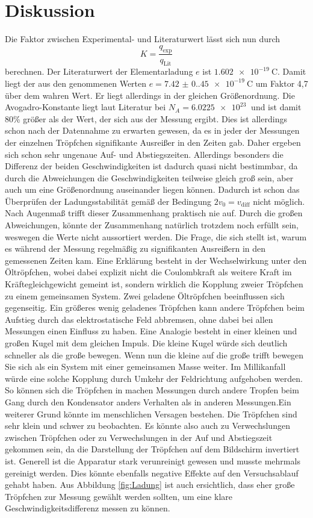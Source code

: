 \section{Diskussion}
Die Faktor zwischen Experimental- und Literaturwert lässt sich nun durch 
\begin{equation}
    K =\frac{q_\text{exp}}{q_\text{Lit}}
\end{equation}
berechnen.
Der Literaturwert der Elementarladung $e$ ist $\qty{1.602e-19}{\coulomb}$\cite{PhysikTabellen}. Damit liegt der aus den genommenen Werten 
$e=\qty{7.42(0.45)e-19}{\coulomb}$ um Faktor 4,7 über dem wahren Wert. Er liegt allerdings in der gleichen Größenordnung.
Die Avogadro-Konstante liegt laut Literatur bei $N_A=\qty{6.0225e23}{}$\cite{PhysikTabellen} und ist damit 80\% größer als der Wert, der sich aus der Messung
ergibt. Dies ist allerdings schon nach der Datennahme zu erwarten gewesen, da es in jeder der Messungen der einzelnen Tröpfchen signifikante
Ausreißer in den Zeiten gab. Daher ergeben sich schon sehr ungenaue Auf- und Abstiegszeiten. Allerdings besonders die Differenz der beiden
Geschwindigkeiten ist dadurch quasi nicht bestimmbar, da durch die Abweichungen die Geschwindigkeiten teilweise gleich groß sein, aber auch um eine Größenordnung auseinander liegen können.
Dadurch ist schon das Überprüfen der Ladungsstabilität gemäß der Bedingung $2v_0=v_\text{diff}$ nicht möglich.
Nach Augenmaß trifft dieser Zusammenhang praktisch nie auf. Durch die großen Abweichungen, könnte der Zusammenhang natürlich trotzdem 
noch erfüllt sein, weswegen die Werte nicht aussortiert werden. Die Frage, die sich stellt ist, warum es während der Messung regelmäßig zu signifikanten
Ausreißern in den gemessenen Zeiten kam. Eine Erklärung besteht in der Wechselwirkung unter den Öltröpfchen, wobei dabei explizit nicht die Coulombkraft als weitere Kraft im
Kräftegleichgewicht gemeint ist, sondern wirklich die Kopplung zweier Tröpfchen zu einem gemeinsamen System. Zwei geladene Öltröpfchen
beeinflussen sich gegenseitig. Ein größeres wenig geladenes Tröpfchen kann andere Tröpfchen beim Aufstieg durch das elektrostatische Feld abbremsen,
ohne dabei bei allen Messungen einen Einfluss zu haben. Eine Analogie besteht in einer kleinen und großen Kugel mit dem gleichen Impuls. Die kleine Kugel würde sich deutlich schneller als die große bewegen.
Wenn nun die kleine auf die große trifft bewegen Sie sich als ein System mit einer gemeinsamen Masse weiter. Im Millikanfall würde eine solche Kopplung durch Umkehr der Feldrichtung aufgehoben werden. So 
können sich die Tröpfchen in machen Messungen durch andere Tropfen beim Gang durch den Kondensator anders Verhalten als in anderen Messungen.Ein weiterer Grund könnte im menschlichen Versagen bestehen. Die Tröpfchen sind sehr klein und schwer zu beobachten.
Es könnte also auch zu Verwechslungen zwischen Tröpfchen oder zu Verwechslungen in der Auf und Abstiegszeit gekommen sein, da die Darstellung der
Tröpfchen auf dem Bildschirm invertiert ist. Generell ist die Apparatur stark verunreinigt gewesen und musste mehrmals gereinigt werden. Dies könnte ebenfalls
negative Effekte auf den Versuchsablauf gehabt haben. Aus Abbildung \ref{fig:Ladung} ist auch ersichtlich, dass eher große Tröpfchen
zur Messung gewählt werden sollten, um eine klare Geschwindigkeitsdifferenz messen zu können.
\label{sec:Diskussion}
